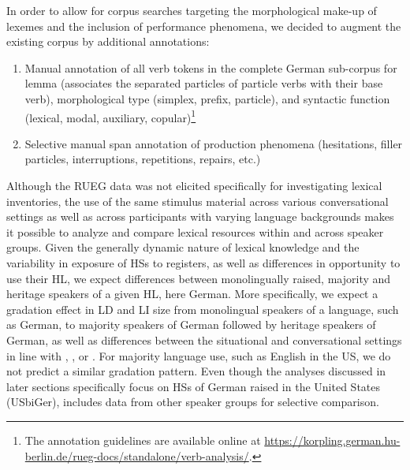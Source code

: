 \documentclass[output=paper,colorlinks,citecolor=brown]{langscibook}
\begin{document}
In order to allow for corpus searches targeting the morphological make-up of lexemes and the inclusion of performance phenomena, we decided to augment the existing corpus by additional annotations:

\begin{enumerate}
    \item Manual annotation of all verb tokens in the complete German sub-corpus for lemma (associates the separated particles of particle verbs with their base verb), morphological type (simplex, prefix, particle), and syntactic function (lexical, modal, auxiliary, copular)\footnote{The annotation guidelines are available online at \url{https://korpling.german.hu-berlin.de/rueg-docs/standalone/verb-analysis/}.}
    \item Selective manual span annotation of production phenomena (hesitations, filler particles, interruptions, repetitions, repairs, etc.)
\end{enumerate}

Although the RUEG data was not elicited specifically for investigating lexical inventories, the use of the same stimulus material across various conversational settings as well as across participants with varying language backgrounds makes it possible to analyze and compare lexical resources within and across speaker groups. Given the generally dynamic nature of lexical knowledge and the variability in exposure of HSs to registers, as well as differences in opportunity to use their HL, we expect differences between monolingually raised, majority and heritage speakers of a given HL, here German. More specifically, we expect a gradation effect in LD and LI size from monolingual speakers of a language, such as German, to majority speakers of German followed by heritage speakers of German, as well as differences between the situational and conversational settings in line with \citet{VanGijselSpeelmanGeeraerts2005Richness}, \citet{Yu2009LDWritingSpeaking}, or \citet{Alamillo2019LexicalSkills}. For majority language use, such as English in the US, we do not predict a similar gradation pattern. Even though the analyses discussed in later sections specifically focus on HSs of German raised in the United States (USbiGer),  includes data from other speaker groups for selective comparison. 
\end{document}

